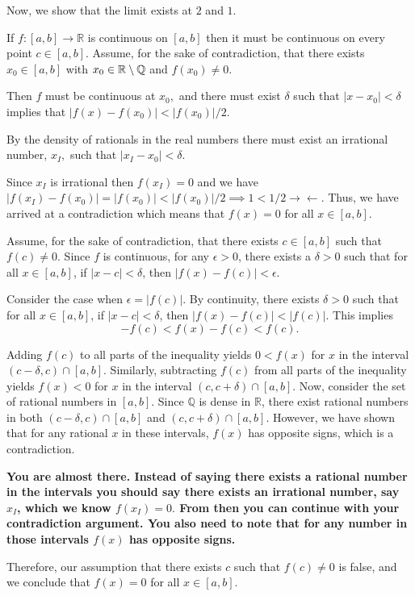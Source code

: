 \documentclass{report}
\begin{document}
Now, we show that the limit exists at $2$ and $1.$
\begin{myproof}
    

If $f:[a, b] \rightarrow \mathbb{R}$ is continuous on $[a, b]$ then it must be continuous on every point $c \in [a,b].$ Assume, for the sake of contradiction, that there exists $x_0 \in [a,b]$ with $x_0 \in \RR \setminus \QQ$ and $f(x_0) \not =0.$

Then $f$ must be continuous at $x_0,$ and there must exist $\delta$ such that $|x-x_0| < \delta$ implies that $|f(x) - f(x_0)| < |f(x_0)|/2.$ 

By the density of rationals in the real numbers there must exist an irrational number, $x_I,$ such that $|x_I - x_0| < \delta.$ 

Since $x_I$ is irrational then $f(x_I) = 0$ and we have $|f(x_I) - f(x_0)| =  |f(x_0)| < \left|f(x_0)\right|/2 \implies 1 < 1/2 \rightarrow\!\leftarrow.$  Thus, we have arrived at a contradiction which means that $f(x)=0$ for all $x \in[a, b].$

\end{myproof}


Assume, for the sake of contradiction, that there exists $c \in[a, b]$ such that $f(c) \neq 0$. Since $f$ is continuous, for any $\epsilon>0$, there exists a $\delta>0$ such that for all $x \in[a, b]$, if $|x-c|<\delta$, then $|f(x)-f(c)|<\epsilon$.

Consider the case when $\epsilon=|f(c)|$. By continuity, there exists $\delta>0$ such that for all $x \in[a, b]$, if $|x-c|<\delta$, then $|f(x)-f(c)|<|f(c)|$. This implies
$$
-f(c)<f(x)-f(c)<f(c) .
$$

Adding $f(c)$ to all parts of the inequality yields $0<f(x)$ for $x$ in the interval $(c-\delta, c) \cap[a, b]$. Similarly, subtracting $f(c)$ from all parts of the inequality yields $f(x)<0$ for $x$ in the interval $(c, c+\delta) \cap[a, b]$. Now, consider the set of rational numbers in $[a, b]$. Since $\mathbb{Q}$ is dense in $\mathbb{R}$, there exist rational numbers in both $(c-\delta, c) \cap[a, b]$ and $(c, c+\delta) \cap[a, b]$. However, we have shown that for any rational $x$ in these intervals, $f(x)$ has opposite signs, which is a contradiction.

\textbf{You are almost there. Instead of saying there exists a rational number in the intervals you should say there exists an irrational number, say $x_I$, which we know $f(x_I)=0.$ From then you can continue with your contradiction argument. You also need to note that for any number in those intervals $f(x)$ has opposite signs.}

Therefore, our assumption that there exists $c$ such that $f(c) \neq 0$ is false, and we conclude that $f(x)=0$ for all $x \in[a, b]$.
\end{document}
